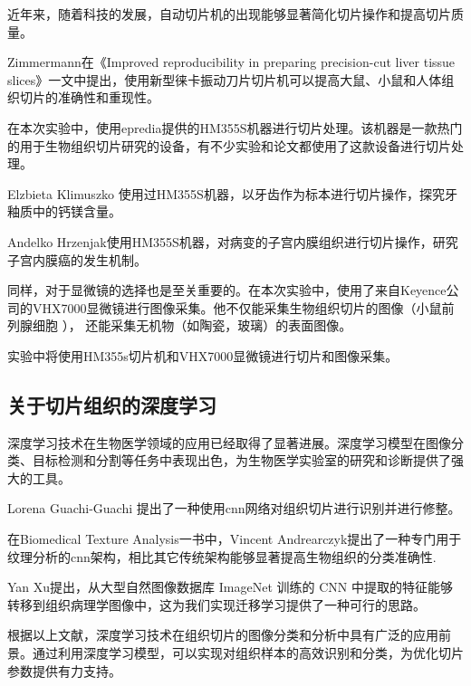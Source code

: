 近年来，随着科技的发展，自动切片机的出现能够显著简化切片操作和提高切片质量。

Zimmermann在《Improved reproducibility in preparing precision-cut liver tissue slices》一文中提出，使用新型徕卡振动刀片切片机可以提高大鼠、小鼠和人体组织切片的准确性和重现性。\cite{LR.1}


在本次实验中，使用epredia提供的HM355S机器进行切片处理。该机器是一款热门的用于生物组织切片研究的设备，有不少实验和论文都使用了这款设备进行切片处理。

Elzbieta Klimuszko 使用过HM355S机器，以牙齿作为标本进行切片操作，探究牙釉质中的钙镁含量。\cite{LR.2}


Andelko Hrzenjak使用HM355S机器，对病变的子宫内膜组织进行切片操作，研究子宫内膜癌的发生机制。\cite{LR.3}

同样，对于显微镜的选择也是至关重要的。在本次实验中，使用了来自Keyence公司的VHX7000显微镜进行图像采集。他不仅能采集生物组织切片的图像（小鼠前列腺细胞
\cite{LR.4}
），
还能采集无机物（如陶瓷\cite{LR.5}，玻璃\cite{LR.6}）的表面图像。


实验中将使用HM355s切片机和VHX7000显微镜进行切片和图像采集。


\subsection{关于切片组织的深度学习}

深度学习技术在生物医学领域的应用已经取得了显著进展。深度学习模型在图像分类、目标检测和分割等任务中表现出色，为生物医学实验室的研究和诊断提供了强大的工具。

Lorena Guachi-Guachi 提出了一种使用cnn网络对组织切片进行识别并进行修整。\cite{LR.7}



在Biomedical Texture Analysis一书中，Vincent Andrearczyk提出了一种专门用于纹理分析的cnn架构，相比其它传统架构能够显著提高生物组织的分类准确性.\cite{LR.8}



Yan Xu提出，从大型自然图像数据库 ImageNet 训练的 CNN 中提取的特征能够转移到组织病理学图像中，这为我们实现迁移学习提供了一种可行的思路。\cite{LR.9}


根据以上文献，深度学习技术在组织切片的图像分类和分析中具有广泛的应用前景。通过利用深度学习模型，可以实现对组织样本的高效识别和分类，为优化切片参数提供有力支持。

\FloatBarrier %
